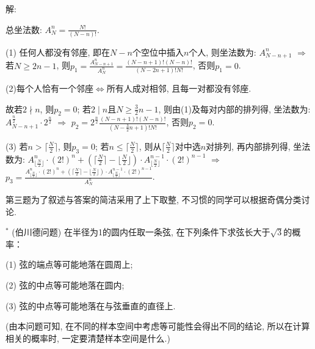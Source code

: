 \documentclass[standard]{ExBook}
\begin{document}
\begin{qitems}
\vspace{-5em}

    \begin{bbox}
解:

总坐法数: $A_{N}^{n}=\frac{N!}{(N-n)!}$.

(1) 任何人都没有邻座, 即在$N-n$个空位中插入$n$个人, 则坐法数为: $A_{N-n+1}^{n}$ $\Longrightarrow$ 若$N \geq 2n-1$, 则$p_{1}=\frac{A_{N-n+1}^{n}}{A_{N}^{n}}=\frac{(N-n+1)!(N-n)!}{(N-2n+1)!N!}$, 否则$p_{1}=0$.

(2)每个人恰有一个邻座$\Longleftrightarrow$所有人成对相邻, 且每一对都没有邻座.

故若$2 \nmid n$, 则$p_{2}=0$; 若$2 \mid n$且$N\geq \frac{3}{2}n-1$, 则由(1)及每对内部的排列得, 坐法数为: $A_{N-n+1}^{\frac{n}{2}}\cdot 2^{\frac{n}{2}}$ $\Longrightarrow$ $p_{2}=2^{\frac{n}{2}}\frac{(N-n+1)!(N-n)!}{(N-\frac{3}{2}n+1)!N!}$, 否则$p_{2}=0$.

(3) 若$n>\lceil\frac{N}{2}\rceil$, 则$p_{3}=0$; 若$n \leq \lceil\frac{N}{2}\rceil$, 则从$\lceil\frac{N}{2}\rceil$对中选$n$对排列, 再内部排列得, 坐法数为: $A_{\lfloor\frac{N}{2}\rfloor}^{n}\cdot(2!)^{n}+(\lceil\frac{N}{2}\rceil-\lfloor\frac{N}{2}\rfloor)\cdot A_{\lfloor\frac{N}{2}\rfloor}^{n-1}\cdot(2!)^{n-1}$ $\Longrightarrow$ $p_{3}=\frac{A_{\lfloor\frac{N}{2}\rfloor}^{n}\cdot(2!)^{n}+(\lceil\frac{N}{2}\rceil-\lfloor\frac{N}{2}\rfloor)\cdot A_{\lfloor\frac{N}{2}\rfloor}^{n-1}\cdot(2!)^{n-1}}{A_{N}^{n}}$.

\textcolor{themeColor}{\selectfont {} 第三题为了叙述与答案的简洁采用了上下取整, 不习惯的同学可以根据奇偶分类讨论.}
    \end{bbox}

\vspace{-5em}

    \begin{bbox}
    \begin{shaded}
        \qitem$^*$
(伯川德问题) 在半径为1的圆内任取一条弦, 在下列条件下求弦长大于$\sqrt{3}$的概率：

(1) 弦的端点等可能地落在圆周上;

(2) 弦的中点等可能地落在圆内;

(3) 弦的中点等可能地落在与弦垂直的直径上.

(由本问题可知, 在不同的样本空间中考虑等可能性会得出不同的结论, 所以在计算相关的概率时, 一定要清楚样本空间是什么.)
    \end{shaded}
    \end{bbox}

\vspace{-5em}


\end{qitems}
\end{document}
